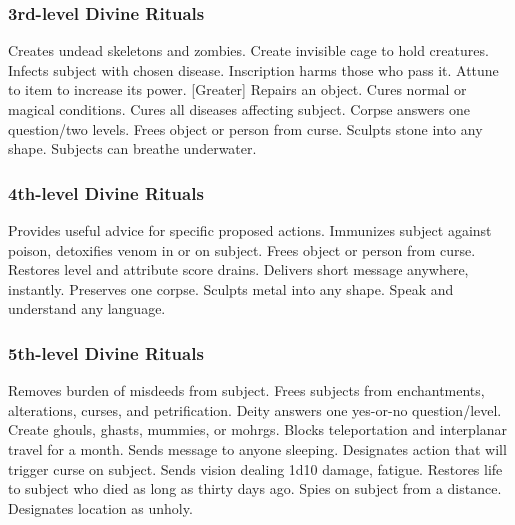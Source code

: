 \subsubsection{3rd-level Divine Rituals}
\begin{rituallist}
     Creates undead skeletons and zombies.
     Create invisible cage to hold creatures.
     Infects subject with chosen disease.
    \M Inscription harms those who pass it.
     Attune to item to increase its power.
    [Greater] Repairs an object.
     Cures normal or magical conditions.
     Cures all diseases affecting subject.
     Corpse answers one question/two levels.
     Frees object or person from curse.
     Sculpts stone into any shape.
     Subjects can breathe underwater.
\end{rituallist}

\subsubsection{4th-level Divine Rituals}
\begin{rituallist}
     Provides useful advice for specific proposed actions.
     Immunizes subject against poison, detoxifies venom in or on subject.
     Frees object or person from curse.
     Restores level and attribute score drains.
     Delivers short message anywhere, instantly.
     Preserves one corpse.
     Sculpts metal into any shape.
     Speak and understand any language.
\end{rituallist}

\subsubsection{5th-level Divine Rituals}
\begin{rituallist}
    \F\M Removes burden of misdeeds from subject.
     Frees subjects from enchantments, alterations, curses, and petrification.
     Deity answers one yes-or-no question/level.
     Create ghouls, ghasts, mummies, or mohrgs.
     Blocks teleportation and interplanar travel for a month.
     Sends message to anyone sleeping.
     Designates action that will trigger curse on subject.
     Sends vision dealing 1d10 damage, fatigue.
     Restores life to subject who died as long as thirty days ago.
    \F Spies on subject from a distance.
     Designates location as unholy.
\end{rituallist}

